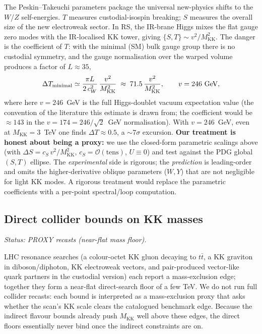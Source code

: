 \documentclass[11pt]{article}
\newcommand{\MKK}{M_{\mathrm{KK}}}
\newcommand{\vev}{v}
\newcommand{\cwsq}{c_W^2}
\begin{document}
The Peskin--Takeuchi parameters package the universal new-physics shifts to the
$W$/$Z$ self-energies. $T$ measures custodial-isospin breaking; $S$ measures the
overall size of the new electroweak sector. In RS, the IR-brane Higgs mixes the
flat gauge zero modes with the IR-localised KK tower, giving
$\{S,T\}\sim \vev^2/\MKK^2$. The danger is the coefficient of $T$: with the
minimal (SM) bulk gauge group there is no custodial symmetry, and the gauge
normalisation over the warped volume produces a factor of $L\approx 35$,
\begin{equation}
\Delta T_{\rm minimal} \simeq \frac{\pi L}{2\,\cwsq}\,\frac{\vev^2}{\MKK^2}
\;\approx\; 71.5\,\frac{\vev^2}{\MKK^2},
\qquad \vev = 246~\text{GeV},
\end{equation}
where here $\vev = 246$~GeV is the full Higgs-doublet vacuum expectation value
(the convention of the literature this estimate is drawn from; the coefficient
would be $\approx 143$ in the $\vev = 174 = 246/\sqrt2$~GeV normalisation). With
$\vev = 246$~GeV, even at $\MKK = 3$~TeV one finds $\Delta T \approx 0.5$, a
$\sim 7\sigma$ excursion.
\textbf{Our treatment is honest about being a proxy:} we use the
closed-form parametric scalings above (with $\Delta S = c_S\,\vev^2/\MKK^2$,
$c_S=\mathcal{O}(\text{tens})$, $U\equiv 0$) and test against the PDG global
$(S,T)$ ellipse. The \emph{experimental} side is rigorous; the \emph{prediction}
is leading-order and omits the higher-derivative oblique parameters ($W,Y$) that
are not negligible for light KK modes. A rigorous treatment would replace the
parametric coefficients with a per-point spectral/loop computation.

\subsection{Direct collider bounds on KK masses}

\emph{Status: PROXY recasts (near-flat mass floor).}

LHC resonance searches (a colour-octet KK gluon decaying to $t\bar t$, a KK
graviton in diboson/diphoton, KK electroweak vectors, and pair-produced
vector-like quark partners in the custodial version) each report a mass-exclusion
edge; together they form a near-flat direct-search floor of a few TeV. We do not
run full collider recasts: each bound is interpreted as a mass-exclusion proxy
that asks whether the scan's KK scale clears the catalogued benchmark edge.
Because the indirect flavour bounds already push $\MKK$ well above these edges,
the direct floors essentially never bind once the indirect constraints are on.
\end{document}
